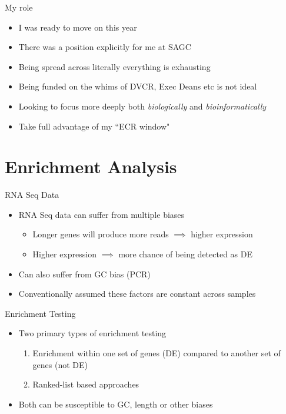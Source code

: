 \documentclass[11pt]{beamer}
\begin{document}
\begin{frame}{My role}

	\begin{itemize}
		\item I was ready to move on this year
		\item There was a position explicitly for me at SAGC
		\item Being spread across literally everything is exhausting
		\item Being funded on the whims of DVCR, Exec Deans etc is not ideal
		\item Looking to focus more deeply both \textit{biologically} and \textit{bioinformatically}
		\item Take full advantage of my ``ECR window"
	\end{itemize}

\end{frame}


\section{Enrichment Analysis}

\begin{frame}{RNA Seq Data}

	\begin{itemize}
		\item RNA Seq data can suffer from multiple biases
		\begin{itemize}
			\item Longer genes will produce more reads $\implies$ higher expression
			\item Higher expression $\implies$ more chance of being detected as DE
		\end{itemize}
		\item Can also suffer from GC bias (PCR)
		\item Conventionally assumed these factors are constant across samples
	\end{itemize}

\end{frame}

\begin{frame}{Enrichment Testing}
	\begin{itemize}
		\item Two primary types of enrichment testing
		\begin{enumerate}
			\item Enrichment within one set of genes (DE) compared to another set of genes (not DE)
			\item Ranked-list based approaches
		\end{enumerate}
		\item Both can be susceptible to GC, length or other biases
	\end{itemize}
\end{frame}
\end{document}
